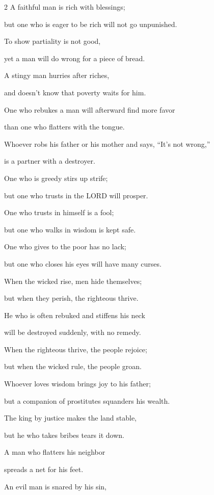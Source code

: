 \begin{multicols}{2}
\myverse{}A faithful man is rich with blessings;

but one who is eager to be rich will not go unpunished.


\myverse{}To show partiality is not good,

yet a man will do wrong for a piece of bread.


\myverse{}A stingy man hurries after riches,

and doesn’t know that poverty waits for him.


\myverse{}One who rebukes a man will afterward find more favor

than one who flatters with the tongue.


\myverse{}Whoever robs his father or his mother and says, “It’s not wrong,”

is a partner with a destroyer.


\myverse{}One who is greedy stirs up strife;

but one who trusts in the LORD will prosper.


\myverse{}One who trusts in himself is a fool;

but one who walks in wisdom is kept safe.


\myverse{}One who gives to the poor has no lack;

but one who closes his eyes will have many curses.


\myverse{}When the wicked rise, men hide themselves;

but when they perish, the righteous thrive.


\mychapter{} \myverse*{}He who is often rebuked and stiffens his neck

\quad\quad will be destroyed suddenly, with no remedy.


\myverse{}When the righteous thrive, the people rejoice;

but when the wicked rule, the people groan.


\myverse{}Whoever loves wisdom brings joy to his father;

but a companion of prostitutes squanders his wealth.


\myverse{}The king by justice makes the land stable,

but he who takes bribes tears it down.


\myverse{}A man who flatters his neighbor

spreads a net for his feet.


\myverse{}An evil man is snared by his sin,


\end{multicols}
